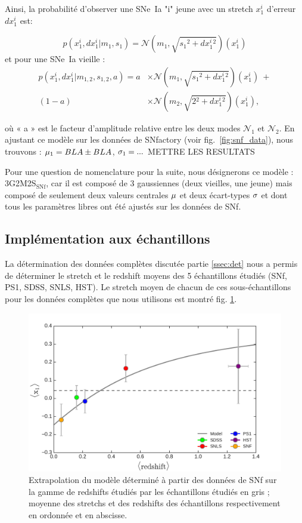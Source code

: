 \documentclass[a4paper, 12pt, svgnames]{article}
\newcommand{\mr}[1]{{\textcolor[rgb]{0.80,0.10,0.1}{#1}}}
\begin{document}
Ainsi, la probabilité d'observer une SNe~Ia "i" jeune avec un stretch $x_1^i$
d'erreur $dx_1^i$ est:

\begin{equation}
    p(x_1^i,dx_1^i | m_1, s_1) = \mathcal{N}\left(m_1,
    \sqrt{s_1{}^2+dx_1^i{}^{2}}\right)(x_1^i)
\end{equation}
et pour une SNe~Ia vieille :
\begin{align}
    p(x_1^i,dx_1^i | m_{1,2}, s_{1,2}, a) = a &\times \mathcal{N}\left(m_1,
    \sqrt{s_1{}^2+dx_1^i{}^{2}}\right)(x_1^i) \ + \\ 
                                    (1-a) &\times \mathcal{N}\left(m_2, \sqrt{
                                    2{}^2+dx_1^i{}^{2}}\right)(x_1^i),
\end{align}

où « a » est le facteur d'amplitude relative entre les deux modes
$\mathcal{N}_1$ et $\mathcal{N}_2$. En ajustant ce modèle sur les données de
SNfactory (voir fig.~\ref{fig:snf_data}), nous trouvons : $\mu_1=BLA\pm BLA$,
$\sigma_1=...$ \mr{METTRE LES RESULTATS}

Pour une question de nomenclature pour la suite, nous désignerons ce modèle :
3G2M2S$_{\mathrm{SNf}}$, car il est composé de 3 gaussiennes (deux vieilles, une
jeune) mais composé de seulement deux valeurs centrales $\mu$ et deux écart-types
$\sigma$ et dont tous les paramètres libres ont été ajustés sur les données de SNf.

\subsection{Implémentation aux échantillons}\label{ssec:model}

La détermination des données complètes discutée partie \ref{ssec:det} nous a
permis de déterminer le stretch et le redshift moyens des 5 échantillons étudiés
(SNf, PS1, SDSS, SNLS, HST). Le stretch moyen de chacun de ces sous-échantillons
pour les données complètes que nous utilisons est montré fig.
\ref{fig:model_snf}.

\begin{figure}[htbp!]
    \centering
    \includegraphics[width=.5\linewidth]{Rapport_figures/model_snf.pdf}
    \captionsetup{justification=centering}
    \caption{Extrapolation du modèle déterminé à partir des données de SNf sur
    la gamme de redshifts étudiés par les échantillons étudiés en gris ; moyenne
des stretchs et des redshifts des échantillons respectivement en ordonnée et en
abscisse.}
    \label{fig:model_snf}
\end{figure}
\end{document}
